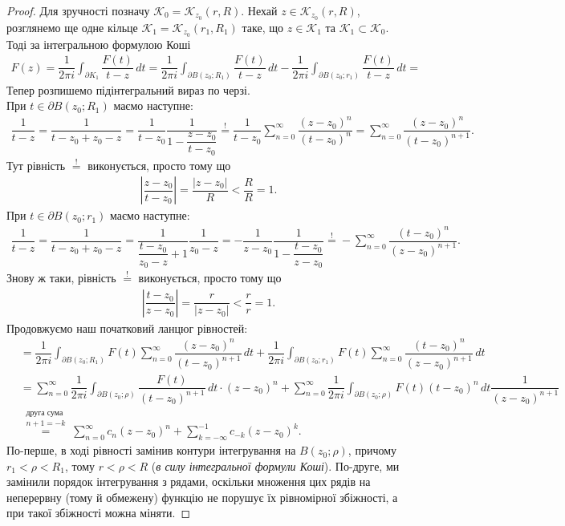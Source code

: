 \documentclass{math_library}
\begin{document}
\begin{proof}
Для зручності позначу $\mathcal{K}_0 = \mathcal{K}_{z_0}(r,R)$. Нехай $z \in \mathcal{K}_{z_0}(r,R)$, розглянемо ще одне кільце $\mathcal{K}_1 = \mathcal{K}_{z_0}(r_1,R_1)$ таке, що $z \in \mathcal{K}_1$ та $\mathcal{K}_1 \subset \mathcal{K}_0$. Тоді за інтегральною формулою Коші
\begin{align*}
F(z) = \dfrac{1}{2 \pi i} \int_{\partial K_1} \dfrac{F(t)}{t-z}\,dt = \dfrac{1}{2\pi i} \int_{\partial B(z_0;R_1)} \dfrac{F(t)}{t-z}\,dt - \dfrac{1}{2\pi i} \int_{\partial B(z_0;r_1)} \dfrac{F(t)}{t-z}\,dt \boxed{=}
\end{align*}
Тепер розпишемо підінтегральний вираз по черзі.\\
При $t \in \partial B(z_0;R_1)$ маємо наступне:
\begin{align*}
\dfrac{1}{t-z} = \dfrac{1}{t-z_0+z_0-z} = \dfrac{1}{t-z_0} \dfrac{1}{1 - \dfrac{z-z_0}{t-z_0}} \overset{!}{=} \dfrac{1}{t-z_0} \sum_{n=0}^\infty \dfrac{(z-z_0)^n}{(t-z_0)^n} = \sum_{n=0}^\infty \dfrac{(z-z_0)^n}{(t-z_0)^{n+1}}.
\end{align*}
Тут рівність $\overset{!}{=}$ виконується, просто тому що
\begin{align*}
\left| \dfrac{z-z_0}{t-z_0} \right| = \dfrac{|z-z_0|}{R} < \dfrac{R}{R} = 1.
\end{align*}
При $t \in \partial B(z_0;r_1)$ маємо наступне:
\begin{align*}
\dfrac{1}{t-z} = \dfrac{1}{t-z_0+z_0-z} = \dfrac{1}{\dfrac{t-z_0}{z_0-z} + 1} \dfrac{1}{z_0-z} = -\dfrac{1}{z-z_0} \dfrac{1}{1 - \dfrac{t-z_0}{z-z_0}} \overset{!}{=} -\sum_{n=0}^\infty \dfrac{(t-z_0)^n}{(z-z_0)^{n+1}}.
\end{align*}
Знову ж таки, рівність $\overset{!}{=}$ виконується, просто тому що
\begin{align*}
\left| \dfrac{t-z_0}{z-z_0} \right| = \dfrac{r}{|z-z_0|} < \dfrac{r}{r} = 1.
\end{align*}
Продовжуємо наш початковий ланцюг рівностей:
\begin{align*}
& \boxed{=} \dfrac{1}{2\pi i} \int_{\partial B(z_0;R_1)} F(t) \sum_{n=0}^\infty \dfrac{(z-z_0)^n}{(t-z_0)^{n+1}} \,dt + \dfrac{1}{2\pi i} \int_{\partial B(z_0;r_1)} F(t) \sum_{n=0}^\infty \dfrac{(t-z_0)^n}{(z-z_0)^{n+1}} \,dt \\
& = \sum_{n=0}^\infty \dfrac{1}{2\pi i} \int_{\partial B(z_0;\rho)} \dfrac{F(t)}{(t-z_0)^{n+1}}\,dt \cdot (z-z_0)^n + \sum_{n=0}^\infty \dfrac{1}{2\pi i} \int_{\partial B(z_0;\rho)} F(t) (t-z_0)^n\,dt \dfrac{1}{(z-z_0)^{n+1}} \\
& \overset{\substack{\text{друга сума} \\ n+1 = -k}}{=} \sum_{n=0}^\infty c_n (z-z_0)^n + \sum_{k=-\infty}^{-1} c_{-k} (z-z_0)^k.
\end{align*}
По-перше, в ході рівності замінив контури інтегрування на $B(z_0;\rho)$, причому $r_1 < \rho < R_1$, тому $r < \rho < R$ (\textit{в силу інтегральної формули Коші}). По-друге, ми замінили порядок інтегрування з рядами, оскільки множення цих рядів на неперервну (тому й обмежену) функцію не порушує їх рівномірної збіжності, а при такої збіжності можна міняти.
\end{proof}
\end{document}
